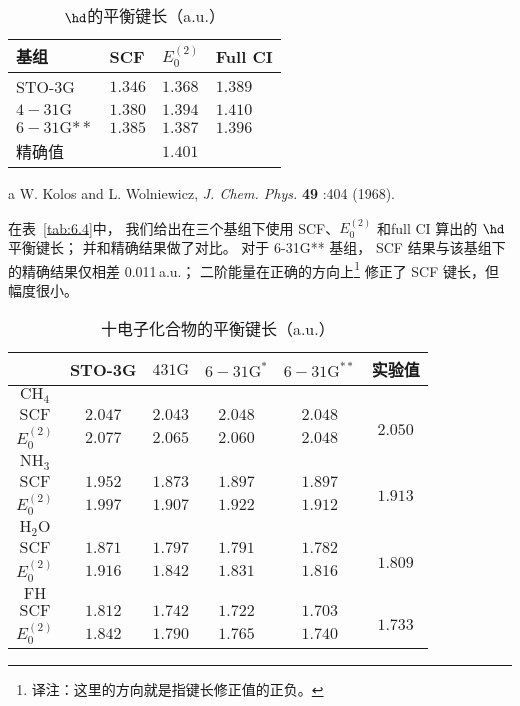 \begin{table}[H]
	\centering
	\caption{$\hd$的平衡键长（a.u.）}
	\begin{threeparttable}
		\begin{tabular}{llll}
			\hline 基组 & SCF & $E_0^{(2)}$ & Full CI \\
			\hline STO-3G & $1.346$ & $1.368$ & $1.389$ \\
			$4-31 \mathrm{G}$ & $1.380$ & $1.394$ & $1.410$ \\
			$6-31 \mathrm{G}{**}$ & $1.385$ & $1.387$ & $1.396$ \\
			\hline 精确值\tnote{a} & & $1.401$ & \\
			\hline
		\end{tabular}
		\begin{tablenotes}
			\item[a] W. Kolos and L. Wolniewicz, \textit{J. Chem. Phys.} \textbf{49} :404 (1968).
		\end{tablenotes}
	\end{threeparttable}
\label{tab:6.4}
\end{table}
在表~\autoref{tab:6.4}中，
我们给出在三个基组下使用 SCF、$E_0^{(2)}$ 和full CI 算出的 $\hd$ 平衡键长；
并和精确结果做了对比。 
对于 6-31G** 基组，
SCF 结果与该基组下的精确结果仅相差 0.011\,a.u.；
二阶能量在正确的方向上\footnote{译注：这里的方向就是指键长修正值的正负。}
修正了 SCF 键长，但幅度很小。

\begin{table}
	\centering
	\caption{十电子化合物的平衡键长（a.u.）}
	\begin{tabular}{cccccc}
		\hline & STO-3G & $431 \mathrm{G}$ & $6-31 \mathrm{G}^*$ & $6-31 \mathrm{G}^{* *}$ & 实验值 \\
		\hline
		$\mathrm{CH}_4$ & & & & & \\
		$\mathrm{SCF}$ & $2.047$ & $2.043$ & $2.048$ & $2.048$ & \multirow{2}{*}{$2.050$}\\
		$E_0^{(2)}$ & $2.077$ & $2.065$ & $2.060$ & $2.048$ & \\
		$\mathrm{NH}_3$ & & & & & \\
		$\mathrm{SCF}$ & $1.952$ & $1.873$ & $1.897$ & $1.897$ & \multirow{2}{*}{$1.913$}\\
		$E_0^{(2)}$ & $1.997$ & $1.907$ & $1.922$ & $1.912$ &  \\
		$\mathrm{H}_2 \mathrm{O}$ & & & & & \\
		$\mathrm{SCF}$ & $1.871$ & $1.797$ & $1.791$ & $1.782$ & \multirow{2}{*}{$1.809$}\\
		$E_0^{(2)}$ & $1.916$ & $1.842$ &  $1.831$ & $1.816$ & \\
		$\mathrm{FH}$ & & & & & \\ 
		$\mathrm{SCF}$ & $1.812$ & $1.742$ & $1.722$ & $1.703$ & \multirow{2}{*}{$1.733$}\\
		$E_0^{(2)}$ & $1.842$ & $1.790$ & $1.765$ & $1.740$ & \\ \hline
	\end{tabular}
	\label{tab:6.5}
\end{table}

